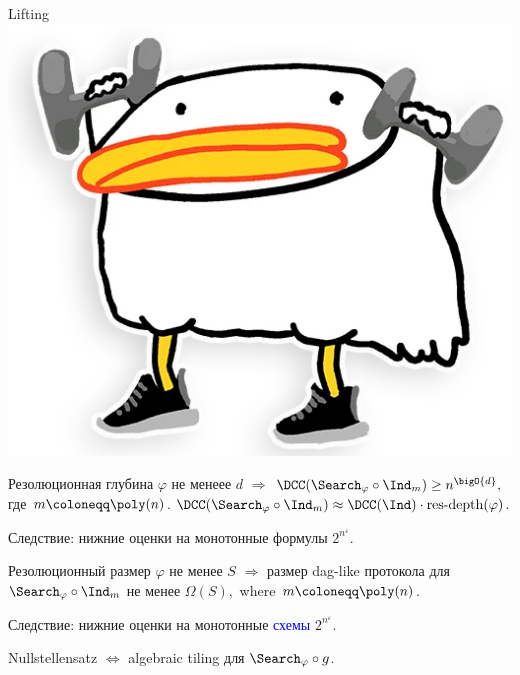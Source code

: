 \begin{frame}{Lifting \includegraphics[scale = 0.04]{pics/utia-lift.png}}

    \begin{theorem}
        Резолюционная глубина $\varphi$ не менеее $d$ $\Rightarrow$
        $\DCC(\Search_{\varphi} \circ \Ind_m) \ge n^{\bigO{d}},$
        где $m \coloneqq \poly(n)$. \alert{$\DCC(\Search_{\varphi} \circ \Ind_m) \approx
            \DCC(\Ind) \cdot \mathrm{res\text{-}depth}(\varphi)$.}
    \end{theorem}

    Следствие: нижние оценки на монотонные формулы $2^{n^{\varepsilon}}$.
    \pause

    \begin{theorem}
        Резолюционный размер $\varphi$ не менее  $S$ $\Rightarrow$
        размер \alert{dag-like} протокола для $\Search_{\varphi} \circ \Ind_m$ не менее $\Omega(S),$
        where $m \coloneqq \poly(n)$.
    \end{theorem}

        Следствие: нижние оценки на монотонные \textcolor{blue}{схемы} $2^{n^{\varepsilon}}$.
    \pause

    \begin{theorem}
        Nullstellensatz $\Leftrightarrow$ \alert{algebraic tiling} для $\Search_{\varphi} \circ g$.
    \end{theorem}

\end{frame}